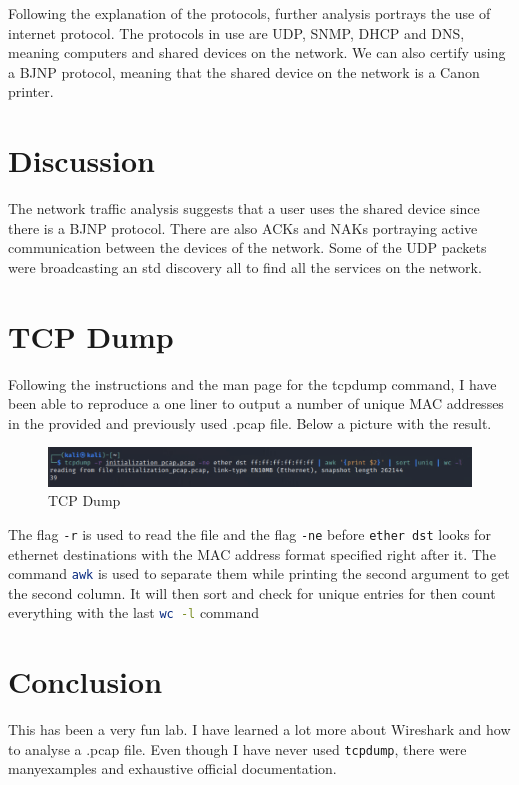 Following the explanation of the protocols, further analysis portrays the use of
internet protocol. The protocols in use are UDP, SNMP, DHCP and DNS, meaning
computers and shared devices on the network. We can also certify using a BJNP
protocol, meaning that the shared device on the network is a Canon printer.

\section{Discussion}
\label{s:Lab1-Discussion}
The network traffic analysis suggests that a user uses the shared device since
there is a BJNP protocol. There are also ACKs and NAKs portraying active
communication between the devices of the network.
Some of the UDP packets were broadcasting an std discovery all to find
all the services on the network.

\section{TCP Dump}
\label{s:TCP-Dump}
Following the instructions and the man page for the tcpdump command, I have been able
to reproduce a one liner to output a number of unique MAC addresses in the provided and previously
used .pcap file. Below a picture with the result.

\begin{figure}[H]
  \centering
  \includegraphics[width=1\textwidth]{figures/tcpdump}
  \caption{TCP Dump}
  \label{f:tcpdump}
\end{figure}

The flag \lstinline[language=bash]!-r! is used to read the file and the flag
\lstinline[language=bash]!-ne! before \lstinline[language=bash]!ether dst! looks
for ethernet destinations with the MAC address format specified right after it.
The command \lstinline[language=bash]!awk! is used to separate them while printing the
second argument to get the second column. It will then sort and check for unique
entries for then count everything with the last \lstinline[language=bash]!wc -l! command

\section{Conclusion}
\label{s:Lab1-Conclusion}
This has been a very fun lab. I have learned a lot more about Wireshark and how
to analyse a .pcap file. Even though I have never used
\lstinline[language=bash]!tcpdump!, there were manyexamples and exhaustive
official documentation.

